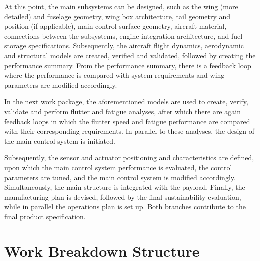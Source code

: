 At this point, the main subsystems can be designed, such as the wing (more detailed) and fuselage geometry, wing box architecture, tail geometry and position (if applicable), main control surface geometry, aircraft material, connections between the subsystems, engine integration architecture, and fuel storage specifications. Subsequently, the aircraft flight dynamics, aerodynamic and structural models are created, verified and validated, followed by creating the performance summary. From the performance summary, there is a feedback loop where the performance is compared with system requirements and wing parameters are modified accordingly.

In the next work package, the aforementioned models are used to create, verify, validate and perform flutter and fatigue analyses, after which there are again feedback loops in which the flutter speed and fatigue performance are compared with their corresponding requirements. In parallel to these analyses, the design of the main control system is initiated.

Subsequently, the sensor and actuator positioning and characteristics are defined, upon which the main control system performance is evaluated, the control parameters are tuned, and the main control system is modified accordingly. Simultaneously, the main structure is integrated with the payload. Finally, the manufacturing plan is devised, followed by the final sustainability evaluation, while in parallel the operations plan is set up. Both branches contribute to the final product specification.





\section{Work Breakdown Structure}

